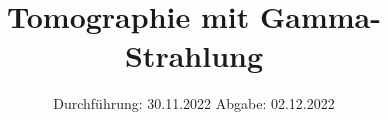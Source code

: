 

\subject{VERSUCH 14}
\title{Tomographie mit Gamma-Strahlung}
\date{%
  Durchführung: 30.11.2022
  \hspace{3em}
  Abgabe: 02.12.2022
}



\maketitle
\thispagestyle{empty}
\tableofcontents
\newpage







\printbibliography{}


